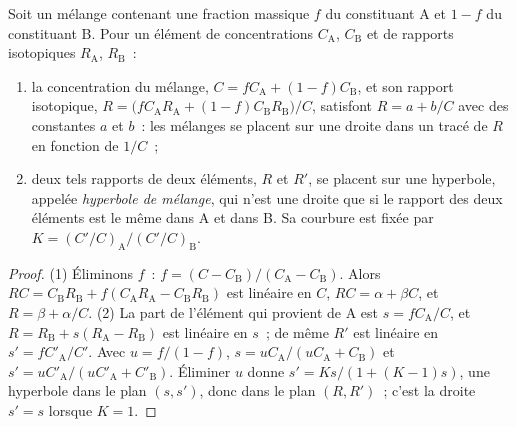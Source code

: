 \begin{proposition}\label{prop:b2:isotope-geochemistry:mixing}
Soit un mélange contenant une fraction massique $f$ du constituant A et $1-f$ du constituant
B. Pour un élément de concentrations $C_{\mathrm A}$, $C_{\mathrm B}$ et de rapports isotopiques
$R_{\mathrm A}$, $R_{\mathrm B}$~:
\begin{enumerate}
\item la concentration du mélange, $C = fC_{\mathrm A} + (1-f)C_{\mathrm B}$, et
son rapport isotopique,
$R = \bigl(fC_{\mathrm A}R_{\mathrm A} + (1-f)C_{\mathrm B}R_{\mathrm B}\bigr)/C$, satisfont
$R = a + b/C$ avec des constantes $a$ et $b$~: les mélanges se placent sur une droite dans
un tracé de $R$ en fonction de $1/C$~;
\item deux tels rapports de deux éléments, $R$ et $R'$, se placent sur une hyperbole, appelée
\emph{hyperbole de mélange}, qui n'est une droite que
si le rapport des deux éléments est le même dans A et dans B. Sa courbure est fixée par
$K = (C'/C)_{\mathrm A}/(C'/C)_{\mathrm B}$.
\end{enumerate}
\end{proposition}

\begin{proof}
(1) Éliminons $f$~: $f = (C - C_{\mathrm B})/(C_{\mathrm A} - C_{\mathrm B})$. Alors
$RC = C_{\mathrm B}R_{\mathrm B} + f(C_{\mathrm A}R_{\mathrm A} - C_{\mathrm B}R_{\mathrm
B})$ est linéaire en $C$, $RC = \alpha + \beta C$, et $R = \beta + \alpha/C$.
(2) La part de l'élément qui provient de A est $s = fC_{\mathrm A}/C$, et $R =
R_{\mathrm B} + s(R_{\mathrm A} - R_{\mathrm B})$ est linéaire en $s$~; de même $R'$ est
linéaire en $s' = fC'_{\mathrm A}/C'$. Avec $u = f/(1-f)$, $s = u C_{\mathrm
A}/(uC_{\mathrm A} + C_{\mathrm B})$ et $s' = uC'_{\mathrm A}/(uC'_{\mathrm A} +
C'_{\mathrm B})$. Éliminer $u$ donne $s' = Ks/(1 + (K-1)s)$, une hyperbole dans le
plan $(s, s')$, donc dans le plan $(R, R')$~; c'est la droite $s' = s$
lorsque $K = 1$.
\end{proof}

